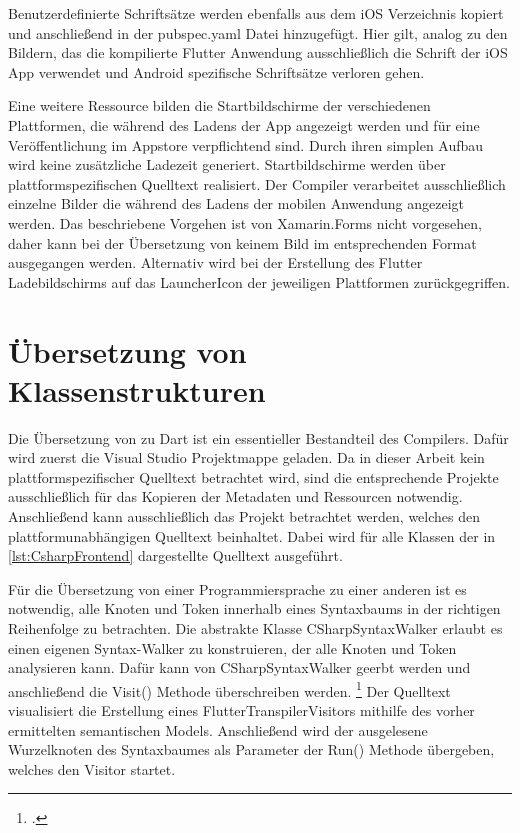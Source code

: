 


Benutzerdefinierte Schriftsätze werden ebenfalls aus dem iOS Verzeichnis kopiert und anschließend in der pubspec.yaml Datei hinzugefügt.  Hier gilt,  analog zu den Bildern,  das die kompilierte Flutter Anwendung ausschließlich die Schrift der iOS App verwendet und Android spezifische Schriftsätze verloren gehen.

Eine weitere Ressource bilden die Startbildschirme der verschiedenen Plattformen,  die während des Ladens der App angezeigt werden und für eine Veröffentlichung im Appstore verpflichtend sind.  Durch ihren simplen Aufbau wird keine zusätzliche Ladezeit generiert.  Startbildschirme werden über plattformspezifischen Quelltext realisiert.   Der Compiler verarbeitet ausschließlich einzelne Bilder die während des Ladens der mobilen Anwendung angezeigt werden.  Das beschriebene Vorgehen ist von Xamarin.Forms nicht vorgesehen, daher kann bei der Übersetzung von keinem Bild im entsprechenden Format ausgegangen werden. Alternativ wird bei der Erstellung des Flutter Ladebildschirms auf das LauncherIcon der jeweiligen Plattformen zurückgegriffen.  

\section{Übersetzung von Klassenstrukturen}

Die Übersetzung von \Csharp zu Dart ist ein essentieller Bestandteil des Compilers.  Dafür wird zuerst die Visual Studio Projektmappe geladen.  Da in dieser Arbeit kein plattformspezifischer Quelltext betrachtet wird,  sind die entsprechende  Projekte ausschließlich für das Kopieren der Metadaten und Ressourcen notwendig.  Anschließend kann ausschließlich das Projekt betrachtet werden, welches den plattformunabhängigen Quelltext beinhaltet.  Dabei wird für alle Klassen der in  \ref{lst:CsharpFrontend} dargestellte Quelltext ausgeführt. 

Für die Übersetzung von einer Programmiersprache zu einer anderen ist es notwendig,  alle Knoten und Token innerhalb eines Syntaxbaums in der richtigen Reihenfolge zu betrachten.  Die abstrakte Klasse \glq CSharpSyntaxWalker\grq{} erlaubt es einen eigenen \glq Syntax-Walker\grq{} zu konstruieren,  der alle Knoten und Token analysieren kann.  Dafür kann von \glq CSharpSyntaxWalker\grq{} geerbt werden und anschließend die \glq Visit()\grq{} Methode überschreiben werden.  \footcite[Vgl.][Abgerufen am \today]{Varty2014}  Der Quelltext visualisiert die Erstellung eines \glq FlutterTranspilerVisitors\grq{} mithilfe des vorher ermittelten semantischen Models.  Anschließend wird der ausgelesene Wurzelknoten des Syntaxbaumes als Parameter der \glq Run()\grq{} Methode übergeben, welches den \glq Visitor\grq{} startet.  


